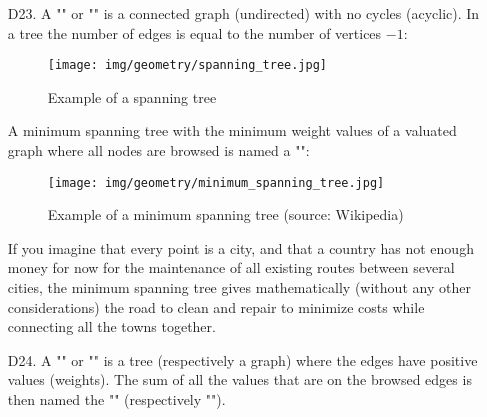 {\begin{enumerate}
\begin{tcolorbox}[title=Remarks,colframe=black,arc=10pt]
	\textbf{R2.} An isolated node (of degree $0$) always constitutes a connected component alone.\\\
	
	\textbf{R3.} The relation on the nodes "there is a path between ..." is an equivalence relation (reflexive, symmetric and transitive). The connected components of a graph correspond to equivalence classes of this relation.
	\end{tcolorbox}
	We will suppose intuitive that a graph $G$ of order $n$ is always associated with at least $n-1$ edges.
	
	\item[D23.] A "" or "" is a connected graph (undirected) with no cycles (acyclic). In a tree the number of edges is equal to the number of vertices $- 1$:
	 \begin{figure}[H]
		\centering
		\texttt{[image: img/geometry/spanning\_tree.jpg]}
		\caption{Example of a spanning tree}
	\end{figure}
	 A minimum spanning tree with the minimum weight values of a valuated graph where all nodes are browsed is named a "":
	 \begin{figure}[H]
		\centering
		\texttt{[image: img/geometry/minimum\_spanning\_tree.jpg]}
		\caption[Example of a minimum spanning tree]{Example of a minimum spanning tree (source: Wikipedia)}
	\end{figure}
	If you imagine that every point is a city, and that a country has not enough money for now for the maintenance of all existing routes between several cities, the minimum spanning tree gives mathematically (without any other considerations) the road to clean and repair to minimize costs while connecting all the towns together.
	
	\item[D24.] A "" or "" is a tree (respectively a graph) where the edges have positive values (weights). The sum of all the values that are on the browsed edges is then named the "" (respectively "").
	

\end{enumerate}}
